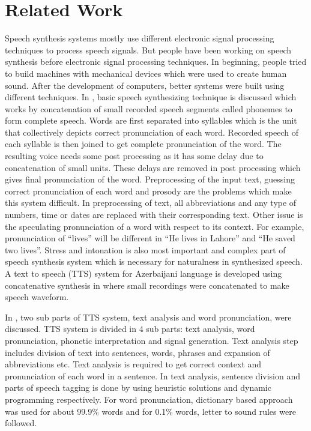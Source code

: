 \chapter{Related Work}

Speech synthesis systems mostly use different electronic signal processing techniques to process speech signals. But people have been working on speech synthesis before electronic signal processing techniques. In beginning, people tried to build machines with mechanical devices which were used to create human sound. After the development of computers, better systems were built using different techniques. In \cite{swetha2013text}, basic speech synthesizing technique is discussed which works by concatenation of small recorded speech segments called phonemes to form complete speech. Words are first separated into syllables which is the unit that collectively depicts correct pronunciation of each word. Recorded speech of each syllable is then joined to get complete pronunciation of the word. The resulting voice needs some post processing as it has some delay due to concatenation of small units. These delays are removed in post processing which gives final pronunciation of the word. Preprocessing of the input text, guessing correct pronunciation of each word and prosody are the problems which make this system difficult. In preprocessing of text, all abbreviations and any type of numbers, time or dates are replaced with their corresponding text. Other issue is the speculating pronunciation of a word with respect to its context. For example, pronunciation of “lives” will be different in “He lives in Lahore” and “He saved two lives”. Stress and intonation is also most important and complex part of speech synthesis system which is necessary for naturalness in synthesized speech. A text to speech (TTS) system for Azerbaijani language is developed using concatenative synthesis in \cite{aida2010main} where small recordings were concatenated to make speech waveform.

In \cite{liberman1992text}, two sub parts of TTS system, text analysis and word pronunciation, were discussed. TTS system is divided in 4 sub parts: text analysis, word pronunciation, phonetic interpretation and signal generation. Text analysis step includes division of text into sentences, words, phrases and expansion of abbreviations etc. Text analysis is required to get correct context and pronunciation of each word in a sentence. In text analysis, sentence division and parts of speech tagging is done by using heuristic solutions \cite{riley1989some} and dynamic programming respectively. For word pronunciation, dictionary based approach was used for about 99.9\% words and for 0.1\% words, letter to sound rules were followed. 


